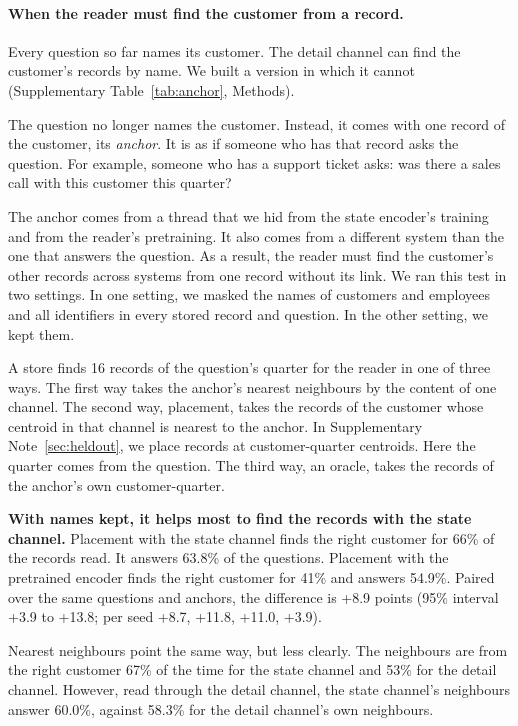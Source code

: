 \documentclass[11pt]{article}
\begin{document}
\paragraph{When the reader must find the customer from a record.} Every question so far names its customer. The detail channel can find the customer's records by name. We built a version in which it cannot (Supplementary Table~\ref{tab:anchor}, Methods).

The question no longer names the customer. Instead, it comes with one record of the customer, its \emph{anchor}. It is as if someone who has that record asks the question. For example, someone who has a support ticket asks: was there a sales call with this customer this quarter?

The anchor comes from a thread that we hid from the state encoder's training and from the reader's pretraining. It also comes from a different system than the one that answers the question. As a result, the reader must find the customer's other records across systems from one record without its link. We ran this test in two settings. In one setting, we masked the names of customers and employees and all identifiers in every stored record and question. In the other setting, we kept them.

A store finds 16 records of the question's quarter for the reader in one of three ways. The first way takes the anchor's nearest neighbours by the content of one channel. The second way, placement, takes the records of the customer whose centroid in that channel is nearest to the anchor. In Supplementary Note~\ref{sec:heldout}, we place records at customer-quarter centroids. Here the quarter comes from the question. The third way, an oracle, takes the records of the anchor's own customer-quarter.

\textbf{With names kept, it helps most to find the records with the state channel.} Placement with the state channel finds the right customer for 66\% of the records read. It answers 63.8\% of the questions. Placement with the pretrained encoder finds the right customer for 41\% and answers 54.9\%. Paired over the same questions and anchors, the difference is +8.9 points (95\% interval +3.9 to +13.8; per seed +8.7, +11.8, +11.0, +3.9).

Nearest neighbours point the same way, but less clearly. The neighbours are from the right customer 67\% of the time for the state channel and 53\% for the detail channel. However, read through the detail channel, the state channel's neighbours answer 60.0\%, against 58.3\% for the detail channel's own neighbours.
\end{document}
